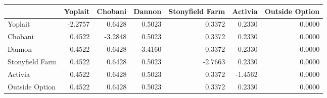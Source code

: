 \begin{tabular}{lrrrrrr}
\toprule
 & Yoplait & Chobani & Dannon & Stonyfield Farm & Activia & Outside Option \\
\midrule
Yoplait & -2.2757 & 0.6428 & 0.5023 & 0.3372 & 0.2330 & 0.0000 \\
Chobani & 0.4522 & -3.2848 & 0.5023 & 0.3372 & 0.2330 & 0.0000 \\
Dannon & 0.4522 & 0.6428 & -3.4160 & 0.3372 & 0.2330 & 0.0000 \\
Stonyfield Farm & 0.4522 & 0.6428 & 0.5023 & -2.7663 & 0.2330 & 0.0000 \\
Activia & 0.4522 & 0.6428 & 0.5023 & 0.3372 & -1.4562 & 0.0000 \\
Outside Option & 0.4522 & 0.6428 & 0.5023 & 0.3372 & 0.2330 & 0.0000 \\
\bottomrule
\end{tabular}
